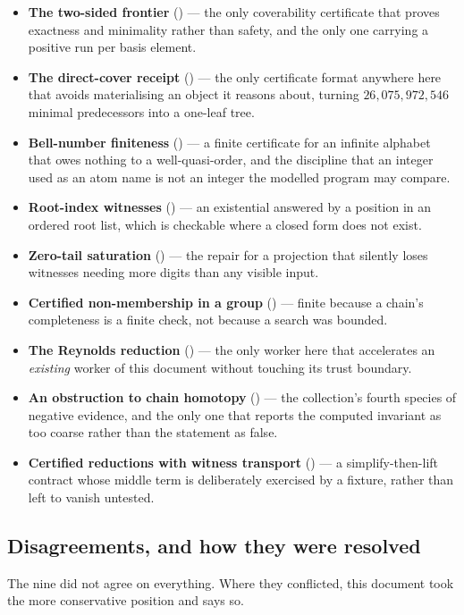 \begin{itemize}[leftmargin=1.4em]
\item \textbf{The two-sided frontier} () --- the only coverability
  certificate that proves exactness and minimality rather than safety, and the
  only one carrying a positive run per basis element.
\item \textbf{The direct-cover receipt} () --- the only certificate
  format anywhere here that avoids materialising an object it reasons about,
  turning $26{,}075{,}972{,}546$ minimal predecessors into a one-leaf tree.
\item \textbf{Bell-number finiteness} () --- a finite certificate for
  an infinite alphabet that owes nothing to a well-quasi-order, and the
  discipline that an integer used as an atom name is not an integer the
  modelled program may compare.
\item \textbf{Root-index witnesses} () --- an existential answered by
  a position in an ordered root list, which is checkable where a closed form
  does not exist.
\item \textbf{Zero-tail saturation} () --- the repair for a projection
  that silently loses witnesses needing more digits than any visible input.
\item \textbf{Certified non-membership in a group} () --- finite
  because a chain's completeness is a finite check, not because a search was
  bounded.
\item \textbf{The Reynolds reduction} () --- the only worker here that
  accelerates an \emph{existing} worker of this document without touching its
  trust boundary.
\item \textbf{An obstruction to chain homotopy} () --- the collection's
  fourth species of negative evidence, and the only one that reports the
  computed invariant as too coarse rather than the statement as false.
\item \textbf{Certified reductions with witness transport} () --- a
  simplify-then-lift contract whose middle term is deliberately exercised by a
  fixture, rather than left to vanish untested.
\end{itemize}

\subsection{Disagreements, and how they were resolved}

The nine did not agree on everything. Where they conflicted, this document took
the more conservative position and says so.

